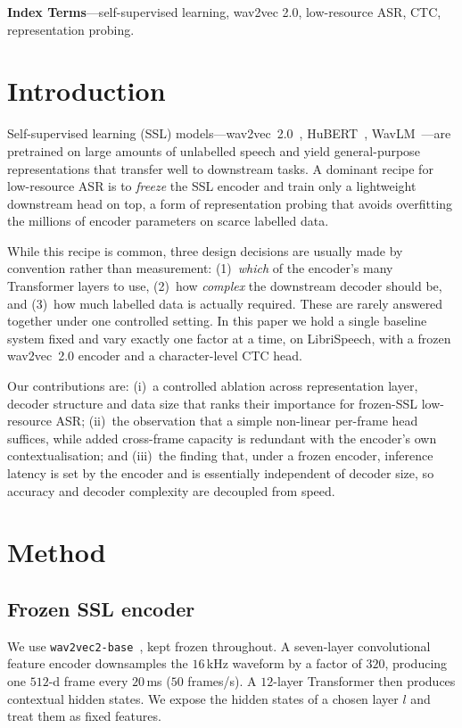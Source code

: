 \noindent\textbf{Index Terms}---self-supervised learning, wav2vec 2.0,
low-resource ASR, CTC, representation probing.

\section{Introduction}
Self-supervised learning (SSL) models---wav2vec~2.0~\cite{w2v2},
HuBERT~\cite{hubert}, WavLM~\cite{wavlm}---are pretrained on large amounts of
unlabelled speech and yield general-purpose representations that transfer well
to downstream tasks. A dominant recipe for low-resource ASR is to \emph{freeze}
the SSL encoder and train only a lightweight downstream head on top, a form of
representation probing that avoids overfitting the millions of encoder
parameters on scarce labelled data.

While this recipe is common, three design decisions are usually made by
convention rather than measurement: (1)~\emph{which} of the encoder's many
Transformer layers to use, (2)~how \emph{complex} the downstream decoder should
be, and (3)~how much labelled data is actually required. These are rarely
answered together under one controlled setting. In this paper we hold a single
baseline system fixed and vary exactly one factor at a time, on LibriSpeech,
with a frozen wav2vec~2.0 encoder and a character-level CTC head.

Our contributions are: (i)~a controlled ablation across representation layer,
decoder structure and data size that ranks their importance for frozen-SSL
low-resource ASR; (ii)~the observation that a simple non-linear per-frame head
suffices, while added cross-frame capacity is redundant with the encoder's own
contextualisation; and (iii)~the finding that, under a frozen encoder,
inference latency is set by the encoder and is essentially independent of
decoder size, so accuracy and decoder complexity are decoupled from speed.

\section{Method}
\subsection{Frozen SSL encoder}
We use \texttt{wav2vec2-base}~\cite{w2v2}, kept frozen throughout. A
seven-layer convolutional feature encoder downsamples the $16$\,kHz waveform by
a factor of $320$, producing one $512$-d frame every $20$\,ms ($50$ frames/s).
A $12$-layer Transformer then produces contextual hidden states. We expose the
hidden states of a chosen layer $l$ and treat them as fixed features.


